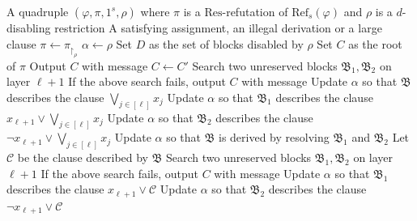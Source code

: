 \newpage

\begin{breakablealgorithm}
    \caption{The extraction algorithm for Resolution}
    \label{algo:algo_extraction}
    \begin{algorithmic}
        \Require A quadruple $(\varphi, \pi, 1^s, \rho)$ where $\pi$ is a $\mathrm{Res}$-refutation of $\mathrm{Ref}_s(\varphi)$ and $\rho$ is a $d$-disabling restriction
        \Ensure A satisfying assignment, an illegal derivation or a large clause
        \State $\pi \gets \pi_{\upharpoonright_{\rho}}$
        \State $\alpha \gets \rho$
        \State Set $D$ as the set of blocks disabled by $\rho$ 
        \State Set $C$ as the root of $\pi$
                \State Output $C$ with message 
                \State $C \gets C'$
                        \State Search two unreserved blocks $\mathfrak{B}_1, \mathfrak{B}_2$ on layer $\ell+1$
                        \State If the above search fails, output $C$ with message 
                        \State Update $\alpha$ so that $\mathfrak{B}$ describes the clause $\bigvee_{j \in [\ell]} x_j$
                        \State Update $\alpha$ so that $\mathfrak{B}_1$ describes the clause $x_{\ell+1} \lor \bigvee_{j \in [\ell]} x_j$
                        \State Update $\alpha$ so that $\mathfrak{B}_2$ describes the clause $\lnot x_{\ell+1} \lor \bigvee_{j \in [\ell]} x_j$
                        \State Update $\alpha$ so that $\mathfrak{B}$ is derived by resolving $\mathfrak{B}_1$ and $\mathfrak{B}_2$
                        \State Let $\mathscr{C}$ be the clause described by $\mathfrak{B}$
                        \State Search two unreserved blocks $\mathfrak{B}_1, \mathfrak{B}_2$ on layer $\ell+1$
                        \State If the above search fails, output $C$ with message 
                        \State Update $\alpha$ so that $\mathfrak{B}_1$ describes the clause $x_{\ell+1} \lor \mathscr{C}$
                        \State Update $\alpha$ so that $\mathfrak{B}_2$ describes the clause $\lnot x_{\ell+1} \lor \mathscr{C}$

\end{algorithmic}
\end{breakablealgorithm}
